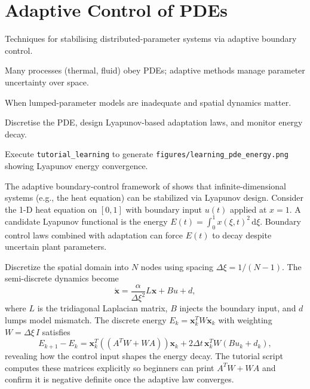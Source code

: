 \section{Adaptive Control of PDEs}
\begin{beginnerguide}
    \item[\textbf{What?}] Techniques for stabilising distributed-parameter systems via adaptive boundary control.
    \item[\textbf{Why?}] Many processes (thermal, fluid) obey PDEs; adaptive methods manage parameter uncertainty over space.
    \item[\textbf{When?}] When lumped-parameter models are inadequate and spatial dynamics matter.
    \item[\textbf{How?}] Discretise the PDE, design Lyapunov-based adaptation laws, and monitor energy decay.
    \item[\textbf{Example}] Execute \texttt{tutorial\_learning} to generate \texttt{figures/learning\_pde\_energy.png} showing Lyapunov energy convergence.
\end{beginnerguide}
The adaptive boundary-control framework of \textcite{krstic1995nonlinear} shows that infinite-dimensional systems (e.g., the heat equation) can be stabilized via Lyapunov design. Consider the 1-D heat equation on $[0, 1]$ with boundary input $u(t)$ applied at $x=1$. A candidate Lyapunov functional is the energy $E(t) = \int_0^1 x(\xi, t)^2\,\mathrm{d}\xi$. Boundary control laws combined with adaptation can force $E(t)$ to decay despite uncertain plant parameters.

Discretize the spatial domain into $N$ nodes using spacing $\Delta \xi = 1/(N-1)$. The semi-discrete dynamics become
\[
    \dot{\mathbf{x}} = \frac{\alpha}{\Delta \xi^2} L \mathbf{x} + B u + d,
\]
where $L$ is the tridiagonal Laplacian matrix, $B$ injects the boundary input, and $d$ lumps model mismatch. The discrete energy $E_k = \mathbf{x}_k^T W \mathbf{x}_k$ with weighting $W = \Delta \xi \, I$ satisfies
\[
    E_{k+1} - E_k = \mathbf{x}_k^T \left((A^T W + W A)\right) \mathbf{x}_k + 2 \Delta t \, \mathbf{x}_k^T W (B u_k + d_k),
\]
revealing how the control input shapes the energy decay. The tutorial script computes these matrices explicitly so beginners can print $A^T W + W A$ and confirm it is negative definite once the adaptive law converges.

